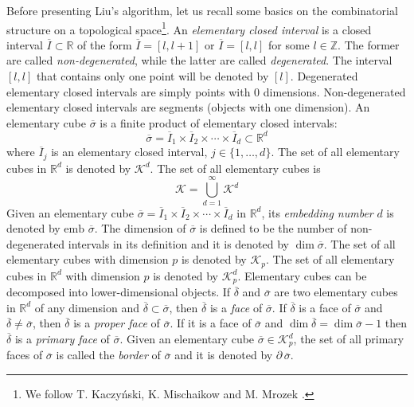 \documentclass[journal]{IEEEtran}
\begin{document}
Before presenting Liu's algorithm, let us recall some basics on the
combinatorial structure on a topological space\footnote{We follow T.
Kaczy{\'n}ski, K. Mischaikow and M. Mrozek \cite{kaczynski2004computational}.}.
An \emph{elementary closed interval} is a closed interval $\overline{I} \subset
\mathbb{R}$ of the form $\overline{I} = [l, l+1] \mbox{ or } \overline{I} = [l,
l]$ for some $l \in \mathbb{Z}$. The former are called \emph{non-degenerated},
while the latter are called \emph{degenerated}. The interval $[l,l]$ that
contains only one point will be denoted by $[l]$. Degenerated elementary closed
intervals are simply points with 0 dimensions. Non-degenerated elementary closed
intervals are segments (objects with one dimension). An elementary cube
$\overline{\sigma}$ is a finite product of elementary closed intervals:
$$
\overline{\sigma} = \overline{I}_1 \times \overline{I}_2 \times \cdots \times
\overline{I}_d \subset \mathbb{R}^d
$$
where $\overline{I}_j$ is an elementary closed interval, $j\in\{1,\dots,d\}$. The set
of all elementary cubes in $\mathbb{R}^d$ is denoted by $\mathcal{K}^d$. The set
of all elementary cubes is
$$
\mathcal{K} = \bigcup_{d=1}^\infty \mathcal{K}^d
$$
Given an elementary cube $\overline{\sigma} = \overline{I}_1 \times
\overline{I}_2 \times \cdots \times \overline{I}_d$ in
$\mathbb{R}^d$, its \emph{embedding number} $d$ is denoted by
$\mbox{emb }\overline{\sigma}$. The dimension of $\overline{\sigma}$
is defined to be the number of non-degenerated intervals in its
definition and it is denoted by $\dim \overline{\sigma}$. The set of
all elementary cubes with dimension $p$ is denoted by
$\mathcal{K}_p$. The set of all elementary cubes in $\mathbb{R}^d$
with dimension $p$ is denoted by $\mathcal{K}^d_p$. Elementary cubes
can be decomposed into lower-dimensional objects. If
$\overline{\delta}$ and $\overline{\sigma}$ are two elementary cubes
in $\mathbb{R}^d$ of any dimension and $\overline{\delta} \subset \overline{\sigma}$,
then $\overline{\delta}$ is a \emph{face} of $\overline{\sigma}$. If
$\overline{\delta}$ is a face of $\overline{\sigma}$ and
$\overline{\delta} \neq \overline{\sigma}$, then $\overline{\delta}$
is a \emph{proper face} of $\overline{\sigma}$. If it is a face of
$\overline{\sigma}$ and $\dim \overline{\delta} = \dim
\overline{\sigma} - 1$ then $\overline{\delta}$ is a \emph{primary
face} of $\overline{\sigma}$. Given an elementary cube
$\overline{\sigma} \in \mathcal{K}^d_p$, the set of all primary
faces of $\overline{\sigma}$ is called the \emph{border} of
$\overline{\sigma}$ and it is denoted by $\partial\,
\overline{\sigma}$.
\end{document}
